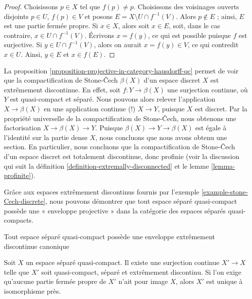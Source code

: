 \begin{proof}
Choisissons $p \in X$ tel que $f(p) \not = p$. Choisissons des voisinages
ouverts disjoints $p \in U$, $f(p) \in V$ et posons
$E = X \setminus U \cap f^{-1}(V)$. Alors $p \not \in E$ ; ainsi, $E$ est une
partie fermée propre. Si $x \in X$, alors soit $x \in E$, soit, dans le cas
contraire, $x \in U \cap f^{-1}(V)$. Écrivons $x = f(y)$, ce qui est possible
puisque $f$ est surjective. Si $y \in U \cap f^{-1}(V)$, alors on aurait
$x = f(y) \in V$, ce qui contredit $x \in U$. Ainsi, $y \in E$ et
$x \in f(E)$.
\end{proof}

\begin{example}
\label{example-stone-Cech-discrete}
La proposition \ref{proposition-projective-in-category-hausdorff-qc} permet de
voir que la compactification de Stone-{\v C}ech $\beta(X)$ d'un espace discret
$X$ est extrêmement discontinue. En effet, soit $f : Y \to \beta(X)$ une
surjection continue, où $Y$ est quasi-compact et séparé. Nous pouvons alors
relever l'application $X \to \beta(X)$ en une application continue (!)
$X \to Y$, puisque $X$ est discret. Par la propriété universelle de la
compactification de Stone-{\v C}ech, nous obtenons une factorisation
$X \to \beta(X) \to Y$. Puisque $\beta(X) \to Y \to \beta(X)$ est égale à
l'identité sur la partie dense $X$, nous concluons que nous avons obtenu une
section.
En particulier, nous concluons que la compactification de Stone-{\v C}ech d'un
espace discret est totalement discontinue, donc profinie
(voir la discussion qui suit la
définition \ref{definition-extremally-disconnected} et le
lemme \ref{lemma-profinite}).
\end{example}

\noindent
Grâce aux espaces extrêmement discontinus fournis par
l'exemple \ref{example-stone-Cech-discrete}, nous pouvons démontrer que tout
espace séparé quasi-compact possède une « enveloppe projective » dans la
catégorie des espaces séparés quasi-compacts.

\begin{lemma}
\label{lemma-existence-projective-cover}
\begin{slogan}
Tout espace séparé quasi-compact possède une enveloppe
extrêmement discontinue canonique
\end{slogan}
Soit $X$ un espace séparé quasi-compact.
Il existe une surjection continue $X' \to X$ telle que $X'$ soit
quasi-compact, séparé et extrêmement discontinu.
Si l'on exige qu'aucune partie fermée propre de $X'$ n'ait pour image $X$,
alors $X'$ est unique à isomorphisme près.
\end{lemma}

